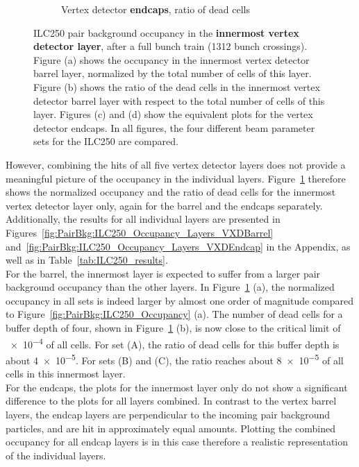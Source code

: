 \begin{figure}
\begin{subfigure}[b]{0.49\textwidth}
   \caption{Vertex detector \textbf{endcaps}, ratio of dead cells}
   \end{subfigure}
   \caption[Pair background occupancy in the \sid vertex detector layer 0 for the ILC250]{ILC250 pair background occupancy in the \textbf{innermost \sid vertex detector layer}, after a full bunch train (\num{1312} bunch crossings).
   Figure (a) shows the occupancy in the innermost vertex detector barrel layer, normalized by the total number of cells of this layer.
   Figure (b) shows the ratio of the dead cells in the innermost vertex detector barrel layer with respect to the total number of cells of this layer.
   Figures (c) and (d) show the equivalent plots for the vertex detector endcaps.
   In all figures, the four different beam parameter sets for the ILC250 are compared.
   }
   \label{fig:PairBkg:ILC250_Occupancy_Layer0}
 \end{figure}
However, combining the hits of all five vertex detector layers does not provide a meaningful picture of the occupancy in the individual layers.
Figure~\ref{fig:PairBkg:ILC250_Occupancy_Layer0} therefore shows the normalized occupancy and the ratio of dead cells for the innermost vertex detector layer only, again for the barrel and the endcaps separately.
Additionally, the results for all individual layers are presented in  Figures~\ref{fig:PairBkg:ILC250_Occupancy_Layers_VXDBarrel} and~\ref{fig:PairBkg:ILC250_Occupancy_Layers_VXDEndcap} in the Appendix, as well as in Table~\ref{tab:ILC250_results}.
\\For the barrel, the innermost layer is expected to suffer from a larger pair background occupancy than the other layers.
In Figure~\ref{fig:PairBkg:ILC250_Occupancy_Layer0} (a), the normalized occupancy in all sets is indeed larger by almost one order of magnitude compared to Figure~\ref{fig:PairBkg:ILC250_Occupancy} (a).
The number of dead cells for a buffer depth of four, shown in Figure~\ref{fig:PairBkg:ILC250_Occupancy_Layer0} (b), is now close to the critical limit of \num{e-4} of all cells.
For set (A), the ratio of dead cells for this buffer depth is about \num{4e-5}.
For sets (B) and (C), the ratio reaches about \num{8e-5} of all cells in this innermost layer.
\\For the endcaps, the plots for the innermost layer only do not show a significant difference to the plots for all layers combined.
In contrast to the vertex barrel layers, the endcap layers are perpendicular to the incoming pair background particles, and are hit in approximately equal amounts.
Plotting the combined occupancy for all endcap layers is in this case therefore a realistic representation of the individual layers.
